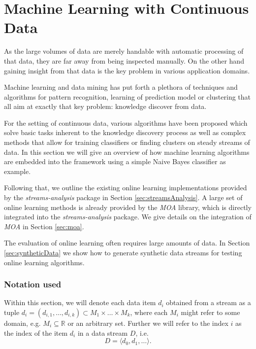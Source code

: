 \clearpage
\section{\label{sec:machineLearning}Machine Learning with Continuous Data}
As the large volumes of data are merely handable with automatic
processing of that data, they are far away from being inspected
manually. On the other hand gaining insight from that data is the key
problem in various application domains.

Machine learning and data mining has put forth a plethora of
techniques and algorithms for pattern recognition, learning of
prediction model or clustering that all aim at exactly that key
problem: knowledge discover from data.

For the setting of continuous data, various algorithms have been
proposed which solve basic tasks inherent to the knowledge discovery
process as well as complex methods that allow for training classifiers
or finding clusters on steady streams of data. In this section we will
give an overview of how machine learning algorithms are embedded into
the \streams framework using a simple Naive Bayes classifier as example.

Following that, we outline the existing online learning implementations
provided by the {\em streams-analysis} package in Section \ref{sec:streamsAnalysis}.
A large set of online learning methods is already provided by the {\em MOA}
library, which is directly integrated into the {\em streams-analysis} package.
We give details on the integration of {\em MOA} in Section \ref{sec:moa}.

The evaluation of online learning often requires large amounts of data.
In Section \ref{sec:syntheticData} we show how to generate synthetic data
streams for testing online learning algorithms.


\subsubsection*{Notation used}
Within this section, we will denote each data item $d_i$ obtained from
a stream as a tuple $d_i = (d_{i,1},\ldots,d_{i,k}) \subset
M_1\times\ldots\times M_k$, where each $M_i$ might refer to some
domain, e.g. $M_i \subseteq \mathbb{R}$ or an arbitrary set. Further
we will refer to the index $i$ as the index of the item $d_i$ in a
data stream $D$, i.e.
\begin{displaymath}
  D = \langle d_0,d_1,\ldots \rangle.
\end{displaymath}


